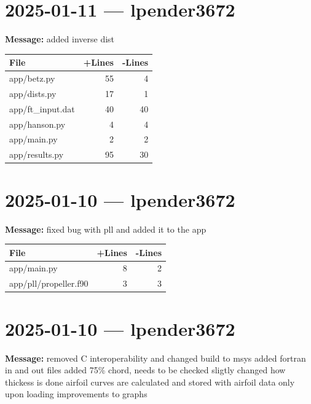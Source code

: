 \documentclass{article}
\begin{document}
\section*{2025-01-11 --- lpender3672}
\textbf{Message:} added inverse dist

\begin{longtable}{|p{10cm}|r|r|}
\hline \textbf{File} & \textbf{+Lines} & \textbf{-Lines} \\
\hline
app/betz.py & 55 & 4 \\
\hline
app/dists.py & 17 & 1 \\
\hline
app/ft\_input.dat & 40 & 40 \\
\hline
app/hanson.py & 4 & 4 \\
\hline
app/main.py & 2 & 2 \\
\hline
app/results.py & 95 & 30 \\
\hline
\end{longtable}

\section*{2025-01-10 --- lpender3672}
\textbf{Message:} fixed bug with pll and added it to the app

\begin{longtable}{|p{10cm}|r|r|}
\hline \textbf{File} & \textbf{+Lines} & \textbf{-Lines} \\
\hline
app/main.py & 8 & 2 \\
\hline
app/pll/propeller.f90 & 3 & 3 \\
\hline
\end{longtable}

\section*{2025-01-10 --- lpender3672}
\textbf{Message:} removed C interoperability and changed build to msys added fortran in and out files added 75\% chord, needs to be checked sligtly changed how thickess is done airfoil curves are calculated and stored with airfoil data only upon loading improvements to graphs
\end{document}
